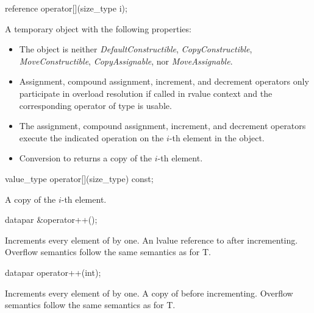 \newcommand{\dataparElementReference}{
  \pnum\returns A temporary object with the following properties:
  \begin{itemize}
    \item \remarks The object is neither \textit{DefaultConstructible}, \textit{CopyConstructible}, \textit{MoveConstructible}, \textit{CopyAssignable}, nor \textit{MoveAssignable}.

    \item \remarks Assignment, compound assignment, increment, and decrement operators only participate in overload resolution if
      called in rvalue context and the corresponding operator of type \valuetype is usable.

    \item \effects The assignment, compound assignment, increment, and decrement operators execute the indicated operation on the $i$-th element in the \datapar object.

    \item \effects Conversion to \valuetype returns a copy of the $i$-th element.
  \end{itemize}
}
\begin{itemdecl}
reference operator[](size_type i);
\end{itemdecl}
\begin{itemdescr}
  \dataparElementReference
\end{itemdescr}

\begin{itemdecl}
value_type operator[](size_type) const;
\end{itemdecl}
\begin{itemdescr}
  \pnum\returns A copy of the $i$-th element.
\end{itemdescr}

\begin{itemdecl}
datapar &operator++();
\end{itemdecl}
\begin{itemdescr}
  \pnum\effects Increments every element of  by one.
  \pnum\returns An lvalue reference to  after incrementing.
  \pnum\remarks Overflow semantics follow the same semantics as for \type T.
\end{itemdescr}

\begin{itemdecl}
datapar operator++(int);
\end{itemdecl}
\begin{itemdescr}
  \pnum\effects Increments every element of  by one.
  \pnum\returns A copy of  before incrementing.
  \pnum\remarks Overflow semantics follow the same semantics as for \type T.
\end{itemdescr}


